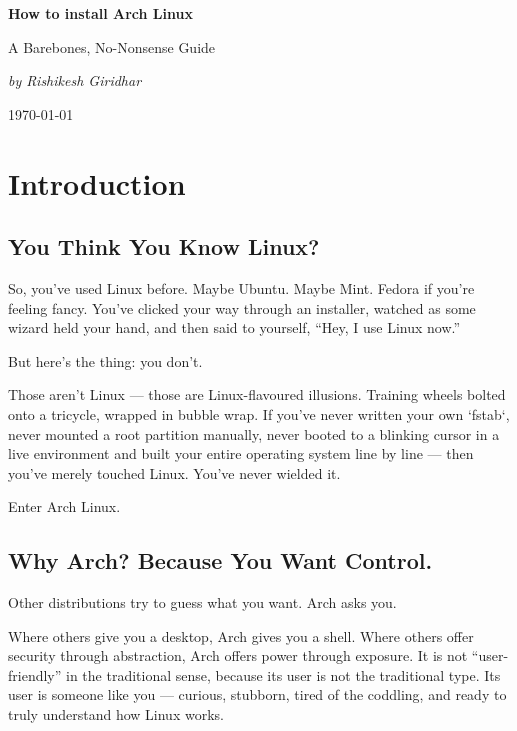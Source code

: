 \documentclass[12pt]{book}
\begin{document}
\begin{titlepage}
    \centering
    \vspace*{4cm}
    {\Huge\bfseries How to install Arch Linux \par}
    \vspace{1cm}
    {\Large A Barebones, No-Nonsense Guide \par}
    \vspace{2cm}
    {\Large \textit{by Rishikesh Giridhar} \par}
    \vfill
    {\large \today \par}
\end{titlepage}

\tableofcontents
\newpage

\chapter{Introduction}

\section*{You Think You Know Linux?}

So, you’ve used Linux before. Maybe Ubuntu. Maybe Mint. Fedora if you're feeling fancy. You’ve clicked your way through an installer, watched as some wizard held your hand, and then said to yourself, “Hey, I use Linux now.”

But here's the thing: you don’t.

Those aren’t Linux — those are Linux-flavoured illusions. Training wheels bolted onto a tricycle, wrapped in bubble wrap. If you’ve never written your own `fstab`, never mounted a root partition manually, never booted to a blinking cursor in a live environment and built your entire operating system line by line — then you’ve merely touched Linux. You’ve never wielded it.

Enter Arch Linux.

\section*{Why Arch? Because You Want Control.}

Other distributions try to guess what you want. Arch asks you.

Where others give you a desktop, Arch gives you a shell. Where others offer security through abstraction, Arch offers power through exposure. It is not “user-friendly” in the traditional sense, because its user is not the traditional type. Its user is someone like you — curious, stubborn, tired of the coddling, and ready to truly understand how Linux works.
\end{document}
